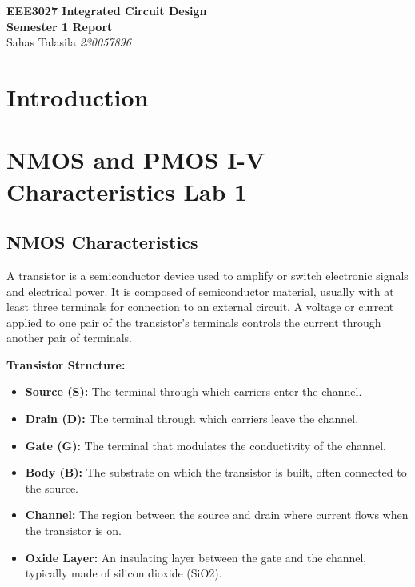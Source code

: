 \documentclass[a4paper,12pt]{article}
\begin{document}
\begin{titlepage}
    \centering
    \vspace*{2cm}
    \Huge{\textbf{EEE3027 Integrated Circuit Design}}\\[0.5cm]
    \Large{\textbf{Semester 1 Report}}\\ 
    \Large{Sahas Talasila \textit{230057896}}
    \vfill
\end{titlepage}

\tableofcontents
\newpage

\begin{abstract}
    This is a placeholder for the abstract of the report.
\end{abstract}

\section{Introduction}

\section{NMOS and PMOS I-V Characteristics Lab 1}

\subsection{NMOS Characteristics}

A transistor is a semiconductor device used to amplify or switch electronic signals and electrical power. 
It is composed of semiconductor material, usually with at least three terminals for connection to an external circuit. A voltage or current applied to one pair of the transistor's terminals controls the current through another pair of terminals.

\textbf{Transistor Structure:}

\begin{itemize}
    \item \textbf{Source (S):} The terminal through which carriers enter the channel.
    \item \textbf{Drain (D):} The terminal through which carriers leave the channel.
    \item \textbf{Gate (G):} The terminal that modulates the conductivity of the channel.
    \item \textbf{Body (B):} The substrate on which the transistor is built, often connected to the source.
    \item \textbf{Channel:} The region between the source and drain where current flows when the transistor is on.  
    \item \textbf{Oxide Layer:} An insulating layer between the gate and the channel, typically made of silicon dioxide (SiO2).
\end{itemize}
\end{document}
